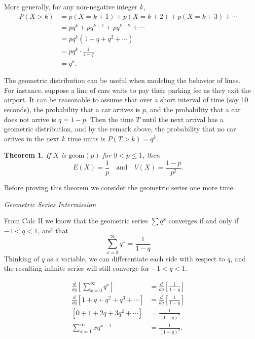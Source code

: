 \documentclass[
]{book}
\newtheorem{theorem}{Theorem}[chapter]
\theoremstyle{definition}
\theoremstyle{definition}
\theoremstyle{definition}
\theoremstyle{definition}
\theoremstyle{remark}
\begin{document}
More generally, for any non-negative integer \(k\),
\begin{align*}
P(X > k) &= p(X=k+1)+p(X=k+2)+p(X=k+3)+\cdots \\
        &= pq^k + pq^{k+1}+pq^{k+2}+\cdots \\
        &= pq^k(1 + q + q^2 + \cdots)\\
        &= pq^k\cdot\frac{1}{1-q}\\
        &= q^k.
\end{align*}

The geometric distribution can be useful when modeling the behavior of lines. For instance, suppose a line of cars waits to pay their parking fee as they exit the airport. It can be reasonable to assume that over a short interval of time (say 10 seconds), the probability that a car arrives is \(p\), and the probability that a car does not arrive is \(q = 1-p.\) Then the time \(T\) until the next arrival has a geometric distribution, and by the remark above, the probability that no car arrives in the next \(k\) time units is \(P(T > k) = q^k\).

\begin{theorem}
\protect\hypertarget{thm:geometric-EandV}{}\label{thm:geometric-EandV}If \(X\) is \(\text{geom}(p)\) for \(0 < p \leq 1\), then \[E(X) = \frac{1}{p}~~~\text{ and }~~~  V(X) = \frac{1-p}{p^2}.\]
\end{theorem}

Before proving this theorem we consider the geometric series one more time.

\emph{Geometric Series Intermission}

From Calc II we know that the geometric series \(\sum q^x\) converges if and only if \(-1 < q < 1\), and that \[\sum_{x = 0}^\infty q^x=\frac{1}{1-q} \tag{provided |q|<1}\] Thinking of \(q\) as a variable, we can differentiate each side with respect to \(q\), and the resulting infinite series will still converge for \(-1 < q < 1\).

\begin{align*}
\frac{d}{dq}\left[\sum_{x = 0}^\infty q^x\right] &= \frac{d}{dq}\left[\frac{1}{1-q}\right] \\
\frac{d}{dq}\left[1+q+q^2 + q^3 + \cdots \right] &= \frac{d}{dq}\left[\frac{1}{1-q}\right] \\
\left[0 + 1 + 2q + 3q^2 + \cdots\right] &= \frac{1}{(1-q)^2}\\
\sum_{x = 1}^\infty x q^{x-1} &= \frac{1}{(1-q)^2}.
\end{align*}
\end{document}
